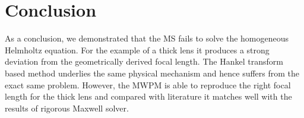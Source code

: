 \documentclass[a4paper,12pt]{article}
\begin{document}
\section{Conclusion}
As a conclusion, we demonstrated that the MS fails to solve the homogeneous Helmholtz equation. For the example of a thick lens it produces 
a strong deviation from the geometrically derived focal length. The Hankel transform based method underlies the same physical mechanism and hence
suffers from the exact same problem.
However, the MWPM is able to reproduce the right focal length for the thick lens and compared with literature it matches well with the results of rigorous Maxwell solver.

\printbibliography
\end{document}
